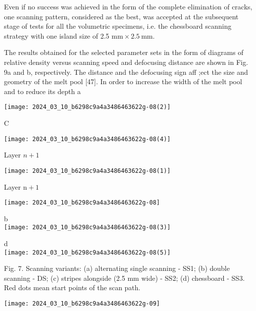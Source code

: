 \documentclass[10pt]{article}
\begin{document}
Even if no success was achieved in the form of the complete elimination of cracks, one scanning pattern, considered as the best, was accepted at the subsequent stage of tests for all the volumetric specimens, i.e. the chessboard scanning strategy with one island size of 2.5 $\mathrm{mm} \times 2.5 \mathrm{~mm}$.

The results obtained for the selected parameter sets in the form of diagrams of relative density versus scanning speed and defocusing distance are shown in Fig. 9a and b, respectively. The distance and the defocusing sign aff ;ect the size and geometry of the melt pool [47]. In order to increase the width of the melt pool and to reduce its depth a

\begin{center}
\texttt{[image: 2024\_03\_10\_b6298c9a4a3486463622g-08(2)]}
\end{center}

C

\begin{center}
\texttt{[image: 2024\_03\_10\_b6298c9a4a3486463622g-08(4)]}
\end{center}

Layer $n+1$

\begin{center}
\texttt{[image: 2024\_03\_10\_b6298c9a4a3486463622g-08(1)]}
\end{center}

Layer $\mathrm{n}+1$

\begin{center}
\texttt{[image: 2024\_03\_10\_b6298c9a4a3486463622g-08]}
\end{center}

b\\
\texttt{[image: 2024\_03\_10\_b6298c9a4a3486463622g-08(3)]}

d\\
\texttt{[image: 2024\_03\_10\_b6298c9a4a3486463622g-08(5)]}

Fig. 7. Scanning variants: (a) alternating single scanning - SS1; (b) double scanning - DS; (c) stripes alongside (2.5 mm wide) - SS2; (d) chessboard - SS3. Red dots mean start points of the scan path.

\begin{center}
\texttt{[image: 2024\_03\_10\_b6298c9a4a3486463622g-09]}
\end{center}
\end{document}
